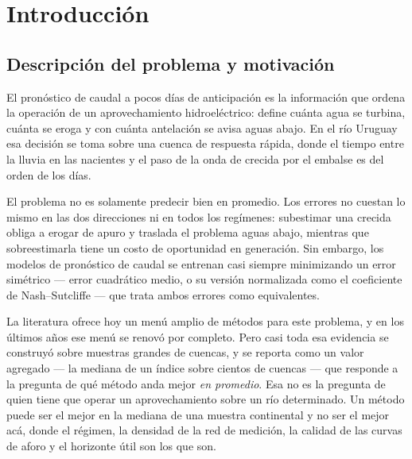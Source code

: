 %
\chapter{Introducción}

\section{Descripción del problema y motivación}

El pronóstico de caudal a pocos días de anticipación es la información que ordena la operación de
un aprovechamiento hidroeléctrico: define cuánta agua se turbina, cuánta se eroga y con cuánta
antelación se avisa aguas abajo.
En el río Uruguay esa decisión se toma sobre una cuenca de respuesta rápida, donde el tiempo entre
la lluvia en las nacientes y el paso de la onda de crecida por el embalse es del orden de los días.

El problema no es solamente predecir bien en promedio.
Los errores no cuestan lo mismo en las dos direcciones ni en todos los regímenes: subestimar una
crecida obliga a erogar de apuro y traslada el problema aguas abajo, mientras que sobreestimarla
tiene un costo de oportunidad en generación.
Sin embargo, los modelos de pronóstico de caudal se entrenan casi siempre minimizando un error
simétrico --- error cuadrático medio, o su versión normalizada como el coeficiente de
Nash--Sutcliffe --- que trata ambos errores como equivalentes.

La literatura ofrece hoy un menú amplio de métodos para este problema, y en los últimos años ese
menú se renovó por completo.
Pero casi toda esa evidencia se construyó sobre muestras grandes de cuencas, y se reporta como un
valor agregado --- la mediana de un índice sobre cientos de cuencas --- que responde a la pregunta
de qué método anda mejor \emph{en promedio}.
Esa no es la pregunta de quien tiene que operar un aprovechamiento sobre un río determinado.
Un método puede ser el mejor en la mediana de una muestra continental y no ser el mejor acá, donde
el régimen, la densidad de la red de medición, la calidad de las curvas de aforo y el horizonte
útil son los que son.

